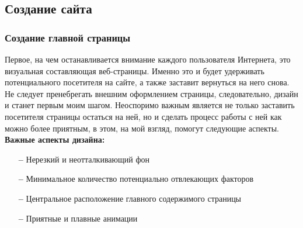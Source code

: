 \documentclass[a4paper, 12pt]{extarticle}
\begin{document}
\subsection{Создание сайта}
\subsubsection{Создание главной страницы}
Первое, на чем останавливается внимание каждого пользователя Интернета, это
визуальная составляющая веб-страницы. Именно это и будет удерживать
потенциального посетителя на сайте, а также заставит вернуться на него снова.
Не следует пренебрегать внешним оформлением страницы, следовательно, дизайн и
станет первым моим шагом. Неоспоримо важным является не только заставить
посетителя страницы остаться на ней, но и сделать процесс работы с ней как
можно более приятным, в этом, на мой взгляд, помогут следующие аспекты.
\\

\textbf{Важные аспекты дизайна:}
\begin{itemize}
    \item[\bfseries--] Нерезкий и неотталкивающий фон
    \item[\bfseries--] Минимальное количество потенциально отвлекающих
        факторов
    \item[\bfseries--] Центральное расположение главного содержимого страницы
    \item[\bfseries--] Приятные и плавные анимации
\end{itemize}
\end{document}
